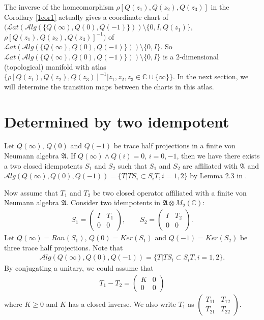 \documentclass[a4paper,10pt]{amsart}
\newcommand{\AAA}{\mathfrak A}
\newcommand{\Lat}{\mathcal Lat}
\newcommand{\Alg}{\mathcal Alg}
\newcommand{\C}{\mathbb C} %
\begin{document}
The inverse of the homeomorphism $\rho[Q(z_1), Q(z_2), Q(z_3)]$ 
in the Corollary \ref{1cor1} actually gives a coordinate chart of 
$(\Lat(\Alg(\{Q(\infty), Q(0), Q(-1)\})) \setminus \{0, I,  Q(z_1)\}$, 
$\rho[Q(z_1), Q(z_2), Q(z_3)]^{-1})$ of 
$\Lat(\Alg(\{Q(\infty), Q(0), Q(-1)\})) \setminus \{0, I \}$.
So $\Lat(\Alg(\{Q(\infty), Q(0), Q(-1)\})) \setminus \{0, I\}$ 
is a 2-dimensional (topological) manifold with atlas
$\{\rho[Q(z_1), Q(z_2), Q(z_3)]^{-1} | 
z_1, z_2, z_3 \in \C \cup \{\infty \} \}$. 
In the next section, we will determine the transition maps between 
the charts in this atlas.

\section{Determined by two idempotent}

Let $Q(\infty)$, $Q(0)$ and $Q(-1)$ be trace half projections in 
a finite von Neumann algebra $\AAA$. If $Q(\infty) \wedge Q(i) = 0$,
$i = 0, -1$, then we have there exists a two closed idempotents 
$S_1$ and $S_2$ such that $S_1$ and $S_2$ are affiliated with $\AAA$ and
$\Alg(Q(\infty), Q(0), Q(-1)) = \{T | TS_i \subset S_{i}T, i = 1,2\}$
by Lemma 2.3 in \cite{WW}.

Now assume that $T_1$ and $T_2$ be two closed operator affiliated with
a finite von Neumann algebra $\AAA$. Consider two idempotents in 
$\AAA \otimes M_{2}(\C)$:
\begin{align*}
   S_1 = \begin{pmatrix}
       I & T_1\\
       0 & 0
   \end{pmatrix}, \qquad
   S_2 = \begin{pmatrix}
       I & T_2 \\
       0 & 0
   \end{pmatrix}.
\end{align*}
Let $Q(\infty) = Ran(S_1)$, $Q(0) = Ker(S_1)$ and $Q(-1)=Ker(S_2)$ be 
three trace half projections. Note that 
\begin{align*}
   \Alg(Q(\infty), Q(0), Q(-1)) = \{T | TS_i \subset S_{i}T, i = 1,2\}.
\end{align*}
By conjugating a unitary, we could assume that
\begin{align*}
   T_1 - T_2  
   = \begin{pmatrix}
      K & 0\\
      0 & 0
   \end{pmatrix} 
\end{align*}
where $K \geq 0$ and $K$ has a closed inverse. We also write $T_1$ as
$\begin{pmatrix}
       T_{11} & T_{12} \\
       T_{21} & T_{22}
\end{pmatrix}$. 
\end{document}

